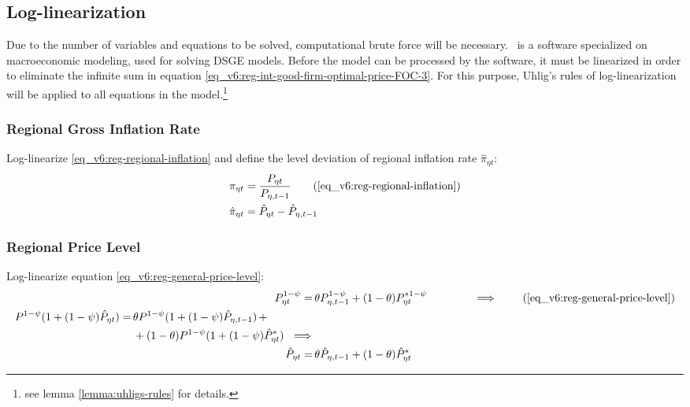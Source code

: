 \documentclass[../thesis.tex]{subfiles}
\begin{document}
	\newpage
	
	
\subsection{Log-linearization}
	
	Due to the number of variables and equations to be solved, computational brute force will be necessary. \dynare \ is a software specialized on macroeconomic modeling, used for solving DSGE models. Before the model can be processed by the software, it must be linearized in order to eliminate the infinite sum in equation \ref{eq_v6:reg-int-good-firm-optimal-price-FOC-3}. For this purpose, Uhlig's rules of log-linearization \cite{uhlig_toolkit_1999} will be applied to all equations in the model.\footnote{see lemma \ref{lemma:uhligs-rules} for details.}


\subsubsection*{Regional Gross Inflation Rate}

Log-linearize \ref{eq_v6:reg-regional-inflation} and define the level deviation of regional inflation rate $\hat{\pi}_{\eta t}$:
\begin{align}
	\pi_{\eta t} &= \frac{P_{\eta t}}{P_{\eta, t-1}} \tag{\ref{eq_v6:reg-regional-inflation}} \\
	\hat{\pi}_{\eta t} &= \hat{P}_{\eta t} - \hat{P}_{\eta, t-1}
	\label{eq_v6:level-dev-regional-inflation}
\end{align}


\subsubsection*{Regional Price Level}

Log-linearize equation \ref{eq_v6:reg-general-price-level}:
\begin{align}
	P_{\eta t}^{1-\psi} =\, &\theta P_{\eta, t-1}^{1-\psi} + (1-\theta) P_{\eta t}^{\ast 1-\psi} \qquad \qquad \implies \tag{\ref{eq_v6:reg-general-price-level}} \\
	\begin{split} P^{1-\psi} (1 + (1-\psi)\hat{P}_{\eta t}) =\, &\theta P^{1-\psi} (1 + (1-\psi)\hat{P}_{\eta, t-1}) \, + \\ & + (1-\theta) P^{1-\psi} (1 + (1-\psi)\hat{P}_{\eta t}^{\ast}) \ \implies \nonumber \end{split} \\
	\hat{P}_{\eta t} =\, &\theta \hat{P}_{\eta, t-1} + (1-\theta) \hat{P}_{\eta t}^{\ast}
	\label{eq_v6:reg-ll-general-price-level}
\end{align}
\end{document}
